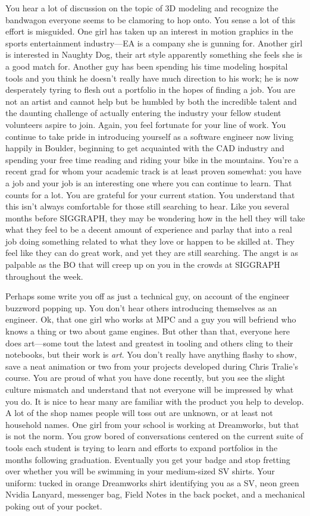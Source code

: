 \documentclass[../main.tex]{subfiles}
\begin{document}
You hear a lot of discussion on the topic of 3D modeling and recognize the bandwagon everyone seems to be clamoring to hop onto. You sense a lot of this effort is misguided. One girl has taken up an interest in motion graphics in the sports entertainment industry---EA is a company she is gunning for. Another girl is interested in Naughty Dog, their art style apparently something she feels she is a good match for. Another guy has been spending his time modeling hospital tools and you think he doesn't really have much direction to his work; he is now desperately tyring to flesh out a portfolio in the hopes of finding a job. You are not an artist and cannot help but be humbled by both the incredible talent and the daunting challenge of actually entering the industry your fellow student volunteers aspire to join. Again, you feel fortunate for your line of work. You continue to take pride in introducing yourself as a software engineer now living happily in Boulder, beginning to get acquainted with the CAD industry and spending your free time reading and riding your bike in the mountains. You're a recent grad for whom your academic track is at least proven somewhat: you have a job and your job is an interesting one where you can continue to learn. That counts for a lot. You are grateful for your current station. You understand that this isn't always comfortable for those still searching to hear. Like you several months before SIGGRAPH, they may be wondering how in the hell they will take what they feel to be a decent amount of experience and parlay that into a real job doing something related to what they love or happen to be skilled at. They feel like they can do great work, and yet they are still searching. The angst is as palpable as the BO that will creep up on you in the crowds at SIGGRAPH throughout the week.

Perhaps some write you off as just a technical guy, on account of the engineer buzzword popping up. You don't hear others introducing themselves as an engineer. Ok, that one girl who works at MPC and a guy you will befriend who knows a thing or two about game engines. But other than that, everyone here does art---some tout the latest and greatest in tooling and others cling to their notebooks, but their work is \textit{art}. You don't really have anything flashy to show, save a neat animation or two from your projects developed during Chris Tralie's course. You are proud of what you have done recently, but you see the slight culture mismatch and understand that not everyone will be impressed by what you do. It is nice to hear many are familiar with the product you help to develop. A lot of the shop names people will toss out are unknown, or at least not household names. One girl from your school is working at Dreamworks, but that is not the norm. You grow bored of conversations centered on the current suite of tools each student is trying to learn and efforts to expand portfolios in the months following graduation. Eventually you get your badge and stop fretting over whether you will be swimming in your medium-sized SV shirts. Your uniform: tucked in orange Dreamworks shirt identifying you as a SV, neon green Nvidia Lanyard, messenger bag, Field Notes in the back pocket, and a mechanical poking out of your pocket.
\end{document}
